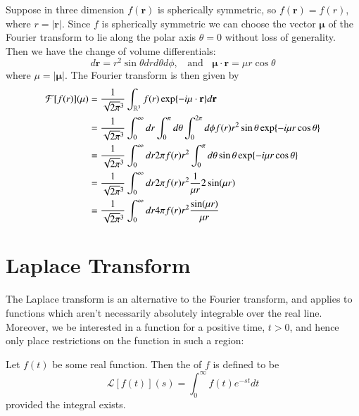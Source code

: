 \documentclass[12pt, a4paper, oneside, openright, titlepage]{book}
\begin{document}
Suppose in three dimension $f(\mathbf{r})$ is spherically symmetric, so $f(\mathbf{r}) = f(r)$, where $r = |\mathbf{r}|$. Since $f$ is spherically symmetric we can choose the vector $\mathbf{\mu}$ of the Fourier transform to lie along the polar axis $\theta = 0$ without loss of generality. Then we have the change of volume differentials: \begin{equation}
    d\mathbf{r} = r^2\sin\theta drd\theta d\phi,\;\;\text{ and }\;\;\mathbf{\mu}\cdot \mathbf{r} = \mu r\cos\theta
\end{equation}
where $\mu = |\mathbf{\mu}|$. The Fourier transform is then given by \begin{align*}
    \mathcal{F}[f(r)](\mathbf{\mu}) &= \frac{1}{\sqrt{2\pi}^3}\int_{\mathbb R^3}f(r)\exp\{-i\mathbf{\mu}\cdot\mathbf{r}\}d\mathbf{r} \\
    &= \frac{1}{\sqrt{2\pi}^3}\int_0^{\infty}dr\int_0^{\pi}d\theta\int_0^{2\pi}d\phi f(r)r^2\sin\theta\exp\{-i\mu r\cos\theta\} \\
    &= \frac{1}{\sqrt{2\pi}^3}\int_0^{\infty}dr2\pi f(r)r^2\int_0^{\pi}d\theta\sin\theta \exp\{-i\mu r\cos\theta\} \\
    &=\frac{1}{\sqrt{2\pi}^3}\int_0^{\infty}dr2\pi f(r)r^2\frac{1}{\mu r}2\sin(\mu r) \\
    &= \frac{1}{\sqrt{2\pi}^3}\int_0^{\infty}dr4\pi f(r)r^2\frac{\sin(\mu r)}{\mu r}
\end{align*}









\section{Laplace Transform}


The Laplace transform is an alternative to the Fourier transform, and applies to functions which aren't necessarily absolutely integrable over the real line. Moreover, we be interested in a function for a positive time, $t > 0$, and hence only place restrictions on the function in such a region:

\begin{defn}
    Let $f(t)$ be some real function. Then the  of $f$ is defined to be \begin{equation}
        \mathcal{L}[f(t)](s) = \int_0^{\infty}f(t)e^{-st}dt
    \end{equation}
    provided the integral exists.
\end{defn}
\end{document}
